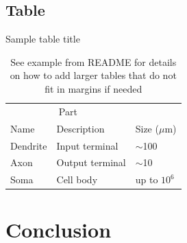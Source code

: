 \lipsum[4]

\subsection{Table}
\begin{table}
 \caption{Sample table title}
 \caption*{See example from README for details on how to add larger tables that do not fit in margins if needed}
  \centering
  \begin{tabular}{lll}
    \toprule
    \multicolumn{2}{c}{Part}                   \\
    \cmidrule(r){1-2}
    Name     & Description     & Size ($\mu$m) \\
    \midrule
    Dendrite & Input terminal  & $\sim$100     \\
    Axon     & Output terminal & $\sim$10      \\
    Soma     & Cell body       & up to $10^6$  \\
    \bottomrule
  \end{tabular}
  \label{tab:table}
\end{table}

\lipsum[5]

\section{Conclusion}
\lipsum[6]
